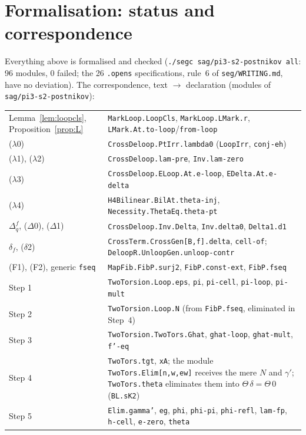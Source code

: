 \documentclass[11pt]{amsart}
\theoremstyle{definition}
\theoremstyle{remark}
\newcommand{\code}[1]{\texttt{#1}}
\begin{document}
\section{Formalisation: status and correspondence}
Everything above is formalised and checked (\code{./segc sag/pi3-s2-postnikov
all}: 96 modules, 0 failed; the 26 \code{.opens} specifications, rule~6 of
\code{seg/WRITING.md}, have no deviation). The correspondence, text $\to$
declaration (modules of \code{sag/pi3-s2-postnikov}):

\smallskip
\noindent
\begin{tabular}{@{}>{\raggedright\arraybackslash}p{}>{\raggedright\arraybackslash}p{}@{}}
Lemma~\ref{lem:loopcls}, Proposition~\ref{prop:L} & \code{MarkLoop.LoopCls}, \code{MarkLoop.LMark.r}, \code{LMark.At.to-loop}/\code{from-loop}\\
($\lambda$0) & \code{CrossDeloop.PtIrr.lambda0} (\code{LoopIrr}, \code{conj-eh})\\
($\lambda$1), ($\lambda$2) & \code{CrossDeloop.lam-pre}, \code{Inv.lam-zero}\\
($\lambda$3) & \code{CrossDeloop.ELoop.At.e-loop}, \code{EDelta.At.e-delta}\\
($\lambda$4) & \code{H4Bilinear.BilAt.theta-inj}, \code{Necessity.ThetaEq.theta-pt}\\
$\Delta^f_q$, ($\Delta$0), ($\Delta$1) & \code{CrossDeloop.Inv.Delta}, \code{Inv.delta0}, \code{Delta1.d1}\\
$\delta_f$, ($\delta$2) & \code{CrossTerm.CrossGen[B,f].delta}, \code{cell-of}; \code{DeloopR.UnloopGen.unloop-contr}\\
(F1), (F2), generic \code{fseq} & \code{MapFib.FibP.surj2}, \code{FibP.const-ext}, \code{FibP.fseq}\\
Step 1 & \code{TwoTorsion.Loop.eps}, \code{pi}, \code{pi-cell}, \code{pi-loop}, \code{pi-mult}\\
Step 2 & \code{TwoTorsion.Loop.N} (from \code{FibP.fseq}, eliminated in Step~4)\\
Step 3 & \code{TwoTorsion.TwoTors.Ghat}, \code{ghat-loop}, \code{ghat-mult}, \code{f'-eq}\\
Step 4 & \code{TwoTors.tgt}, \code{xA}; the module \code{TwoTors.Elim[n,w,ew]} receives the mere $N$ and $\gamma'$; \code{TwoTors.theta} eliminates them into $\Theta\,\delta=\Theta\,0$ (\code{BL.sK2})\\
Step 5 & \code{Elim.gamma'}, \code{eg}, \code{phi}, \code{phi-pi}, \code{phi-refl}, \code{lam-fp}, \code{h-cell}, \code{e-zero}, \code{theta}\\

\end{tabular}
\end{document}
